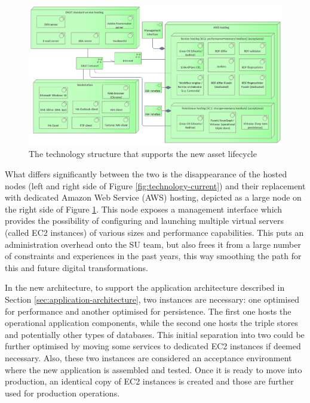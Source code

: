 	\begin{figure}[!h]
		\centering
		\includegraphics[width=1.01\textwidth]{images/technology/New Platform.png}
		\caption{The technology structure that supports the new asset lifecycle}
		\label{fig:technology-new}
	\end{figure}

	What differs significantly between the two is the disappearance of the hosted nodes (left and right side of Figure \ref{fig:technology-current}) and their replacement with dedicated Amazon Web Service (AWS) hosting, depicted as a large node on the right side of Figure \ref{fig:technology-new}. This node exposes a management interface which provides the possibility of configuring and launching multiple virtual servers (called EC2 instances) of various sizes and performance capabilities. This puts an administration overhead onto the SU team, but also frees it from a large number of constraints and experiences in the past years, this way smoothing the path for this and future digital transformations.
	
	In the new architecture, to support the application architecture described in Section \ref{sec:application-architecture}, two instances are necessary: one optimised for performance and another optimised for persistence. The first one hosts the operational application components, while the second one hosts the triple stores and potentially other types of databases. This initial separation into two could be further optimised by moving some services to dedicated EC2 instances if deemed necessary. Also, these two instances are considered an acceptance environment where the new application is assembled and tested. Once it is ready to move into production, an identical copy of EC2 instances is created and those are further used for production operations. 
	
